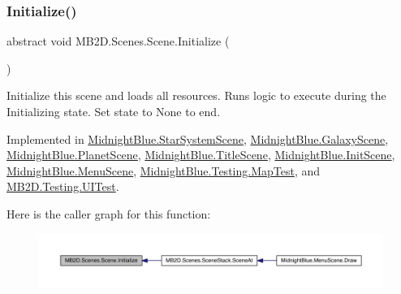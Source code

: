 \hypertarget{class_m_b2_d_1_1_scenes_1_1_scene_a081b4f8866936b495bdce388a7c96c25}{}\label{class_m_b2_d_1_1_scenes_1_1_scene_a081b4f8866936b495bdce388a7c96c25} 
\subsubsection{\texorpdfstring{Initialize()}{Initialize()}}
{\footnotesize\ttfamily abstract void M\+B2\+D.\+Scenes.\+Scene.\+Initialize (\begin{DoxyParamCaption}{ }\end{DoxyParamCaption})\hspace{0.3cm}{\ttfamily [pure virtual]}}



Initialize this scene and loads all resources. Runs logic to execute during the Initializing state. Set state to None to end. 



Implemented in \hyperlink{class_midnight_blue_1_1_star_system_scene_a1b593cd45d0f1b6c02f17ec5dd1033ca}{Midnight\+Blue.\+Star\+System\+Scene}, \hyperlink{class_midnight_blue_1_1_galaxy_scene_a97d97e56a73d9a4b7caf6dd6ce86647e}{Midnight\+Blue.\+Galaxy\+Scene}, \hyperlink{class_midnight_blue_1_1_planet_scene_ac8b7e88283b22b87aa45f116b549e86f}{Midnight\+Blue.\+Planet\+Scene}, \hyperlink{class_midnight_blue_1_1_title_scene_a793aa8253fba8d62a4ee19f042b22891}{Midnight\+Blue.\+Title\+Scene}, \hyperlink{class_midnight_blue_1_1_init_scene_a99eee8cc5dab8d7263591aeaa50144fb}{Midnight\+Blue.\+Init\+Scene}, \hyperlink{class_midnight_blue_1_1_menu_scene_ab46d90617acf2fad0a3c759337c54aaf}{Midnight\+Blue.\+Menu\+Scene}, \hyperlink{class_midnight_blue_1_1_testing_1_1_map_test_adcaa2f37efbf5764b48d297cabf17784}{Midnight\+Blue.\+Testing.\+Map\+Test}, and \hyperlink{class_m_b2_d_1_1_testing_1_1_u_i_test_af6f33faaa93d646edd5c74dfee6139d1}{M\+B2\+D.\+Testing.\+U\+I\+Test}.

Here is the caller graph for this function\+:\nopagebreak
\begin{figure}[H]
\begin{center}
\leavevmode
\includegraphics[width=350pt]{class_m_b2_d_1_1_scenes_1_1_scene_a081b4f8866936b495bdce388a7c96c25_icgraph}
\end{center}
\end{figure}
\hypertarget{class_m_b2_d_1_1_scenes_1_1_scene_a0661eff0223150fa8e9ea88145409e5d}{}\label{class_m_b2_d_1_1_scenes_1_1_scene_a0661eff0223150fa8e9ea88145409e5d} 
